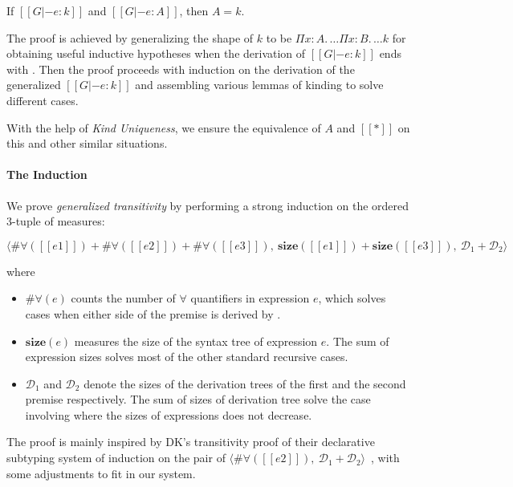 \begin{theorem}
    If $[[G |- e : k]]$ and $[[G |- e : A]]$,
    then $A = k$.
\end{theorem}

\noindent The proof is achieved by generalizing the shape of $k$ to be
$\Pi x : A.\, \dots \Pi x : B.\, \dots k$ for obtaining useful inductive hypotheses
when the derivation of $[[G |- e : k]]$ ends with . Then the proof
proceeds with induction on the derivation of the generalized $[[G |- e : k]]$ and
assembling various lemmas of kinding to solve different cases.

With the help of \emph{Kind Uniqueness},
we ensure the equivalence of $A$ and $[[*]]$ on this and other similar situations.

\paragraph{The Induction}

We prove \emph{generalized transitivity} by performing a strong induction on
the ordered 3-tuple of measures:

$$
\langle \#\forall([[e1]]) + \#\forall([[e2]]) + \#\forall([[e3]]), ~
\mathbf{size}([[e1]]) + \mathbf{size}([[e3]]), ~
\mathcal{D}_1 + \mathcal{D}_2 \rangle
$$

\noindent where

\begin{itemize}
    \item $\#\forall(e)$ counts the number of $\forall$ quantifiers
    in expression $e$, which solves cases when either side of the premise is
    derived by .
    \item $\mathbf{size}(e)$ measures the size of the syntax tree of
    expression $e$. The sum of expression sizes solves most of the other
    standard recursive cases.
    \item $\mathcal{D}_1$ and $\mathcal{D}_2$ denote the sizes of the derivation
    trees of the first and the second premise respectively. The sum of sizes
    of derivation tree solve the case involving  where the sizes of
    expressions does not decrease.
\end{itemize}

The proof is mainly inspired by DK's transitivity proof of their declarative subtyping
system of induction on the pair of
$\langle \#\forall([[e2]]) ,~ \mathcal{D}_1 + \mathcal{D}_2 \rangle$~\citep{dunfield2013lemmas},
with some adjustments to fit in our system.

